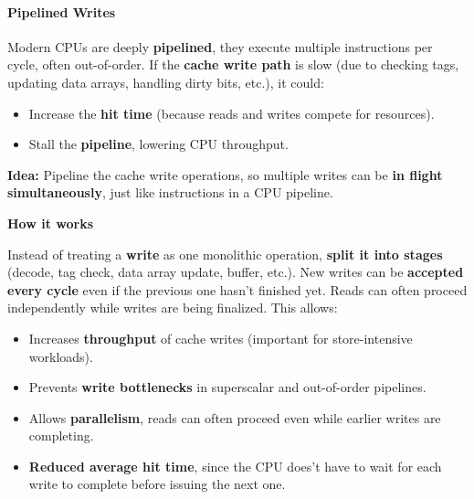 \paragraph{Pipelined Writes}\label{paragraph: Pipelined Writes}

Modern CPUs are deeply \textbf{pipelined}, they execute multiple instructions per cycle, often out-of-order. If the \textbf{cache write path} is slow (due to checking tags, updating data arrays, handling dirty bits, etc.), it could:
\begin{itemize}
    \item Increase the \textbf{hit time} (because reads and writes compete for resources).
    \item Stall the \textbf{pipeline}, lowering CPU throughput.
\end{itemize}
\textbf{Idea:} Pipeline the cache write operations, so multiple writes can be \textbf{in flight simultaneously}, just like instructions in a CPU pipeline.

\highspace
\begin{flushleft}
    \textcolor{Green3}{ \textbf{How it works}}
\end{flushleft}
Instead of treating a \textbf{write} as one monolithic operation, \textbf{split it into stages} (decode, tag check, data array update, buffer, etc.). New writes can be \textbf{accepted every cycle} even if the previous one hasn't finished yet. Reads can often proceed independently while writes are being finalized. This allows:
\begin{itemize}
    \item[\textcolor{Green3}{\faIcon{check}}] Increases \textbf{throughput} of cache writes (important for store-intensive workloads).
    \item[\textcolor{Green3}{\faIcon{check}}] Prevents \textbf{write bottlenecks} in superscalar and out-of-order pipelines.
    \item[\textcolor{Green3}{\faIcon{check}}] Allows \textbf{parallelism}, reads can often proceed even while earlier writes are completing.
    \item[\textcolor{Green3}{\faIcon{check}}] \textbf{Reduced average hit time}, since the CPU does't have to wait for each write to complete before issuing the next one.
\end{itemize}

